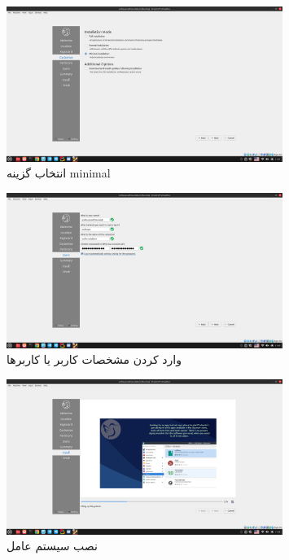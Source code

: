 \documentclass[12pt]{article}
\begin{document}
\begin{enumerate}
        \begin{figure}[H]
		\centering
		\includegraphics[width=0.8\textwidth]{report1-resources/6.png}
		\caption{انتخاب گزینه \textenglish{minimal}}
	\end{figure}

        \begin{figure}[H]
		\centering
		\includegraphics[width=0.8\textwidth]{report1-resources/7.png}
		\caption{وارد کردن مشخصات کاربر یا کاربرها}
	\end{figure}

        \begin{figure}[H]
		\centering
		\includegraphics[width=0.8\textwidth]{report1-resources/8.png}
		\caption{نصب سیستم عامل}
	\end{figure}

        \end{enumerate}
\end{document}
